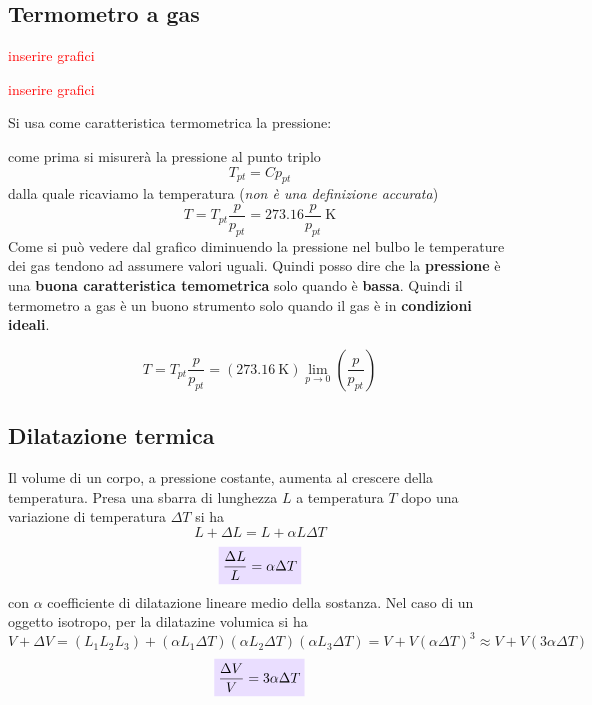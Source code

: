 \documentclass[x11names]{report}
\newcommand{\viola}[1]{\colorbox{yred}{$\displaystyle #1$}}
\begin{document}
\subsection{Termometro a gas}
\begin{center}
	\begin{minipage}{0.49\textwidth}
		\begin{center}
			\textcolor{red}{inserire grafici}
		\end{center}
	\end{minipage}
	\begin{minipage}{0.49\textwidth}
		\begin{center}
			\textcolor{red}{inserire grafici}
		\end{center}
	\end{minipage}
\end{center}
Si usa come caratteristica termometrica la pressione:

come prima si misurerà la pressione al punto triplo
\[ 
T_{pt} = Cp_{pt}
\]
dalla quale ricaviamo la temperatura \colorbox{attenzione}{(\textit{non è una definizione accurata})}
\[ 
T = T_{pt}\frac{p}{p_{pt}} = 273.16\frac{p}{p_{pt}}\SI{}{\kelvin}
\]
Come si può vedere dal grafico diminuendo la pressione nel bulbo le temperature dei gas tendono ad assumere valori uguali. Quindi posso dire che la \textbf{pressione} è una \textbf{buona caratteristica temometrica} solo quando è \textbf{bassa}. Quindi il termometro a gas è un buono strumento solo quando il gas è in \textbf{condizioni ideali}.

\[ 
T = T_{pt}\frac{p}{p_{pt}} = \left(\SI{273.16}{\kelvin}\right)\lim_{p\to 0}\left(\frac{p}{p_{pt}}\right)
\]

\subsection{Dilatazione termica}
Il volume di un corpo, a pressione costante, aumenta al crescere della temperatura. Presa una sbarra di lunghezza \(L\) a temperatura \(T\) dopo una variazione di temperatura \(\Delta T\) si ha
\[ 
L +\Delta L = L + \alpha L\Delta T
\]
\[ 
\viola{\frac{\Delta L}{L} = \alpha \Delta T}
\]
con \(\alpha\) coefficiente di dilatazione lineare medio della sostanza. Nel caso di un oggetto isotropo, per la dilatazine volumica si ha
\[ 
V + \Delta V = \left(L_1L_2L_3\right) + \left(\alpha L_1 \Delta T\right)\left(\alpha L_2 \Delta T\right)\left(\alpha L_3 \Delta T\right) = V + V(\alpha \Delta T)^3 \approx V + V(3\alpha \Delta T)
\]
\[ 
\viola{\frac{\Delta V}{V} = 3\alpha \Delta T}
\]
\end{document}
